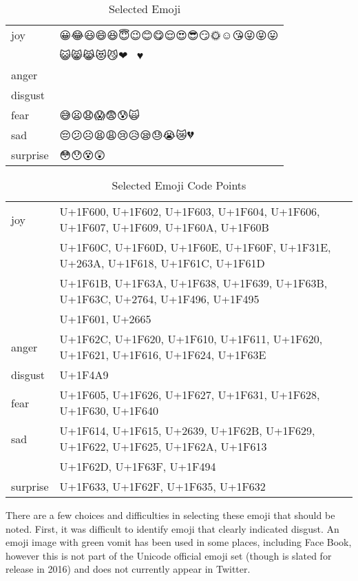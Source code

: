 \documentclass[10pt, a4paper]{article}
\begin{document}
\begin{table}
	\begin{tabular}{ll}
		joy & 😀😂😃😄😆😇😉😊😋😌😍😎😏🌞☺😘😜😝😛 \\
		& 😺😸😹😻😼❤💖💕😁♥ \\
		anger & 😬😠😐😑😠😡😖😤😾 \\
		disgust & 💩 \\
		fear & 😅😦😧😱😨😰🙀 \\
		sad & 😔😕☹😫😩😢😥😪😓😭😿💔 \\
		surprise & 😳😯😵😲 \\
	\end{tabular}
	\caption{Selected Emoji}
	\label{tab:selected-emoji}
\end{table}

\begin{table}
	\begin{tabular}{ll}
joy      & {\tiny U+1F600, U+1F602, U+1F603, U+1F604, U+1F606, U+1F607, U+1F609, U+1F60A, U+1F60B} \\
         & {\tiny U+1F60C, U+1F60D, U+1F60E, U+1F60F, U+1F31E, U+263A, U+1F618, U+1F61C, U+1F61D} \\
         & {\tiny U+1F61B, U+1F63A, U+1F638, U+1F639, U+1F63B, U+1F63C, U+2764, U+1F496, U+1F495} \\
         & {\tiny U+1F601, U+2665} \\
anger    & {\tiny U+1F62C, U+1F620, U+1F610, U+1F611, U+1F620, U+1F621, U+1F616, U+1F624, U+1F63E} \\
disgust  & {\tiny U+1F4A9} \\
fear     & {\tiny U+1F605, U+1F626, U+1F627, U+1F631, U+1F628, U+1F630, U+1F640} \\
sad      & {\tiny U+1F614, U+1F615, U+2639, U+1F62B, U+1F629, U+1F622, U+1F625, U+1F62A, U+1F613} \\
         & {\tiny U+1F62D, U+1F63F, U+1F494} \\
surprise & {\tiny U+1F633, U+1F62F, U+1F635, U+1F632} \\
	\end{tabular}
	\caption{Selected Emoji Code Points}
	\label{tab:selected-emoji-codpoints}
\end{table}

There are a few choices and difficulties in selecting these emoji that should be noted.
First, it was difficult to identify emoji that clearly indicated disgust. 
An emoji image with green vomit has been used in some places, including Face Book, however this is not part of the Unicode official emoji set (though is slated for release in 2016) and does not currently appear in Twitter.
\end{document}

